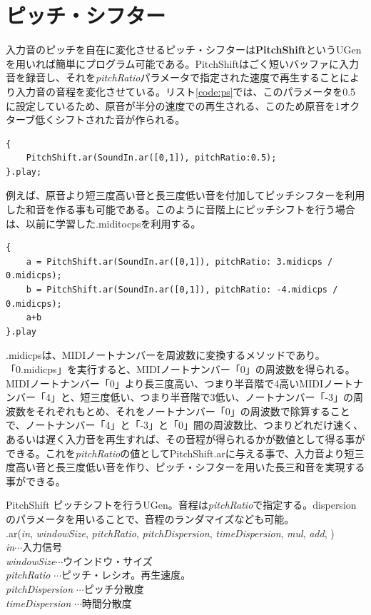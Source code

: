 \documentclass{jsarticle}
\begin{document}
\section{ピッチ・シフター}
入力音のピッチを自在に変化させるピッチ・シフターは{\bf PitchShift}というUGenを用いれば簡単にプログラム可能である。PitchShiftはごく短いバッファに入力音を録音し、それを{\it pitchRatio}パラメータで指定された速度で再生することにより入力音の音程を変化させている。リスト\ref{code:ps}では、このパラメータを0.5に設定しているため、原音が半分の速度での再生される、このため原音を1オクターブ低くシフトされた音が作られる。

\begin{lstlisting}[caption=ピッチシフター, label=code:ps]
{
	PitchShift.ar(SoundIn.ar([0,1]), pitchRatio:0.5);
}.play;
\end{lstlisting}

例えば、原音より短三度高い音と長三度低い音を付加してピッチシフターを利用した和音を作る事も可能である。このように音階上にピッチシフトを行う場合は、以前に学習した.miditocpsを利用する。

\begin{lstlisting}[caption=ピッチシフターによる和音, label=code:ps_chord]
{
	a = PitchShift.ar(SoundIn.ar([0,1]), pitchRatio: 3.midicps / 0.midicps);
	b = PitchShift.ar(SoundIn.ar([0,1]), pitchRatio: -4.midicps / 0.midicps);
	a+b
}.play
\end{lstlisting}

.midicpsは、MIDIノートナンバーを周波数に変換するメソッドであり。「0.midicps」を実行すると、MIDIノートナンバー「0」の周波数を得られる。MIDIノートナンバー「0」より長三度高い、つまり半音階で4高いMIDIノートナンバー「4」と、短三度低い、つまり半音階で3低い、ノートナンバー「-3」の周波数をそれぞれもとめ、それをノートナンバー「0」の周波数で除算することで、ノートナンバー「4」と「-3」と「0」間の周波数比、つまりどれだけ速く、あるいは遅く入力音を再生すれば、その音程が得られるかが数値として得る事ができる。これを{\it pitchRatio}の値としてPitchShift.arに与える事で、入力音より短三度高い音と長三度低い音を作り、ピッチ・シフターを用いた長三和音を実現する事ができる。

\begin{itembox}[l]{PitchShift}
{\footnotesize 
ピッチシフトを行うUGen。音程は{\it pitchRatio}で指定する。dispersionのパラメータを用いることで、音程のランダマイズなども可能。\\
.ar({\it in}, {\it windowSize}, {\it pitchRatio}, {\it pitchDispersion}, {\it timeDispersion}, {\it mul}, {\it add}, )\\

{\it in}$\cdots$入力信号\\
{\it windowSize}$\cdots$ウインドウ・サイズ\\
{\it pitchRatio} $\cdots$ピッチ・レシオ。再生速度。\\
{\it pitchDispersion} $\cdots$ピッチ分散度\\
{\it timeDispersion} $\cdots$時間分散度\\
}
\end{itembox}
\end{document}
